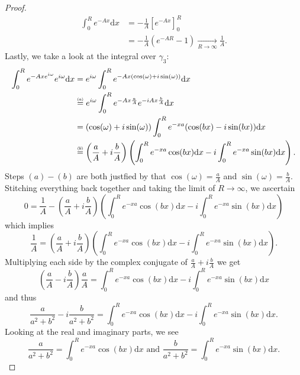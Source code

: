 \documentclass{article}
\newcommand\numeq[1]%
  {\stackrel{\scriptscriptstyle(\mkern-1.5mu#1\mkern-1.5mu)}{=}}
\begin{document}
\begin{proof}
\begin{align*}
  \int_0^{R} e^{-Ax} \mathrm{d}x &= -\frac{1}{A}\left[e^{-Ax} \right]_0^R \\
  &= -\frac{1}{A} \left(e^{-AR} - 1 \right) \xrightarrow[R \to \infty]{} \frac{1}{A}.
\end{align*}
Lastly, we take a look at the integral over $\gamma_3$:
\begin{align*}
  \int_0^R e^{-Axe^{i \omega}}e^{i \omega} \mathrm{d}x &= e^{i \omega}\int_0^Re^{-Ax (\cos(\omega) + i \sin(\omega))} \mathrm{d}x \\
  &\numeq{a}e^{i \omega}\int_0^Re^{-Ax \frac{a}{A}}e^{-iAx\frac{b}{A}}\mathrm{d}x \\
  &= (\cos(\omega) + i \sin(\omega)) \int_0^Re^{-xa}(\cos(bx) -i\sin(bx))\mathrm{d}x \\
  &\numeq{b}\left(\frac{a}{A} +i\frac{b}{A}\right) \left(\int_0^Re^{-xa}\cos(bx) \mathrm{d}x -i \int_0^R e^{-xa}\sin(bx) \mathrm{d}x \right). 
\end{align*}
Steps $(a)-(b)$ are both justfied by that $\cos(\omega) = \frac{a}{A}$ and $\sin(\omega) = \frac{b}{A}$. Stitching everything back together and taking the limit of $R \to \infty$, we ascertain
\[
 0 = \frac{1}{A} -  \left(\frac{a}{A} +i\frac{b}{A}\right) \left(\int_0^Re^{-xa}\cos(bx) \mathrm{d}x -i \int_0^R e^{-xa}\sin(bx) \mathrm{d}x \right)
\]
which implies
\[
 \frac{1}{A} = \left(\frac{a}{A} +i\frac{b}{A}\right) \left(\int_0^Re^{-xa}\cos(bx) \mathrm{d}x -i \int_0^R e^{-xa}\sin(bx) \mathrm{d}x \right). 
\]
Multiplying each side by the complex conjugate of $\frac{a}{A} +i\frac{b}{A}$ we get
\[
 \left(\frac{a}{A} - i \frac{b}{A} \right)\frac{a}{A} = \int_0^Re^{-xa}\cos(bx) \mathrm{d}x -i \int_0^R e^{-xa}\sin(bx) \mathrm{d}x
\]
and thus 
\[
 \frac{a}{a^2+b^2} -i\frac{b}{a^2 + b^2} = \int_0^Re^{-xa}\cos(bx) \mathrm{d}x -i \int_0^R e^{-xa}\sin(bx) \mathrm{d}x. 
\]
Looking at the real and imaginary parts, we see
\[
  \frac{a}{a^2+b^2} = \int_0^Re^{-xa}\cos(bx) \mathrm{d}x \text{   and  } \frac{b}{a^2 + b^2} = \int_0^Re^{-xa}\sin(bx) \mathrm{d}x. 
\]
\end{proof}
\end{document}
